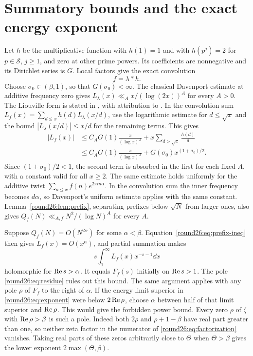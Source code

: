 \section{Summatory bounds and the exact energy exponent}

Let $h$ be the multiplicative function with $h(1)=1$ and with
$h(p^j)=2$ for $p\in\mathcal S$, $j\ge1$, and zero at other prime
powers. Its coefficients are nonnegative and its Dirichlet series
is $G$. Local factors give the exact convolution
\begin{equation}\label{round26:eq:convolution}
 f=\lambda*h.
\end{equation}
Choose $\sigma_0\in(\beta,1)$, so that $G(\sigma_0)<\infty$.
The classical Davenport estimate at additive frequency zero gives
$L_\lambda(x)\ll_A x/(\log(2x))^A$ for every $A>0$. The Liouville
form is stated in \cite[\S1, after Lemma~1.4]{Round26mrt}, with attribution
to \cite{Round26davenport}. In the convolution sum
$L_f(x)=\sum_{d\le x}h(d)L_\lambda(x/d)$, use the logarithmic estimate
for $d\le\sqrt x$ and the bound $|L_\lambda(x/d)|\le x/d$ for the
remaining terms. This gives
\begin{align*}
 |L_f(x)|&\le C_A G(1)\frac{x}{(\log x)^A}
                +x\sum_{d>\sqrt x}\frac{h(d)}d\\
         &\le C_A G(1)\frac{x}{(\log x)^A}
                +G(\sigma_0)x^{(1+\sigma_0)/2}.
\end{align*}
Since $(1+\sigma_0)/2<1$, the second term is absorbed in the first
for each fixed $A$, with a constant valid for all $x\ge2$.
The same estimate holds uniformly for the additive twist
$\sum_{n\le x}f(n)e^{2\pi i n\alpha}$. In the convolution sum
the inner frequency becomes $d\alpha$, so Davenport's uniform
estimate applies with the same constant.
Lemma~\ref{round26:lem:prefix}, separating prefixes below $\sqrt N$ from
larger ones, also gives $Q_f(N)\ll_{A,f}N^2/(\log N)^A$ for every $A$.

Suppose $Q_f(N)=O(N^{2\alpha})$ for some $\alpha<\beta$.
Equation~\eqref{round26:eq:prefix-ineq} then gives $L_f(x)=O(x^\alpha)$,
and partial summation makes
\[
 s\int_1^\infty L_f(x)x^{-s-1}\dd x
\]
holomorphic for $\operatorname{Re} s>\alpha$. It equals $F_f(s)$ initially on
$\operatorname{Re} s>1$. The pole \eqref{round26:eq:residue} rules out this bound.
The same argument applies with any pole $\rho$ of $F_f$ to the
right of $\alpha$. If the energy limit superior in \eqref{round26:eq:exponent}
were below $2\operatorname{Re}\rho$, choose $\alpha$ between half of that limit
superior and $\operatorname{Re}\rho$. This would give the forbidden power bound.
Every zero $\rho$ of $\zeta$ with
$\operatorname{Re}\rho>\beta$ is such a pole. Indeed both $2\rho$ and
$\rho+1-\beta$ have real part greater than one, so neither
zeta factor in the numerator of \eqref{round26:eq:factorization} vanishes.
Taking real parts of these zeros arbitrarily close to $\Theta$
when $\Theta>\beta$ gives the lower exponent $2\max(\Theta,\beta)$.

